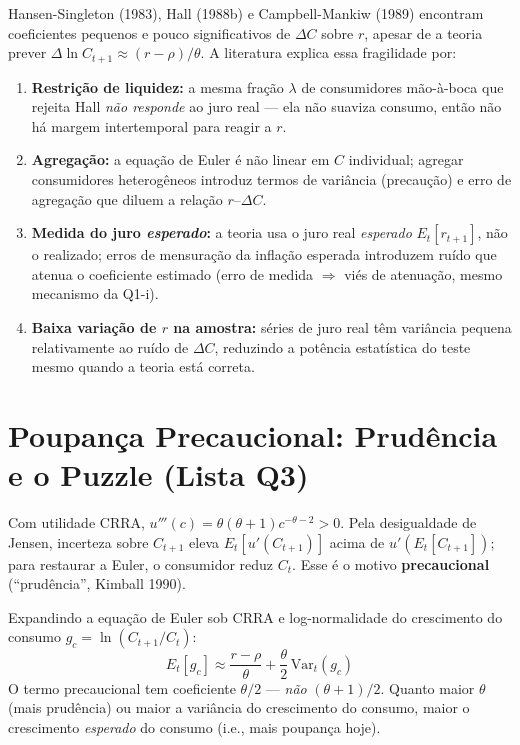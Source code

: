 \documentclass[12pt, a4paper]{article}
\begin{document}
\begin{fatorbox}[title={Q2: por que o juro real tem baixo poder explicativo sobre $\Delta C$?}]
Hansen-Singleton (1983), Hall (1988b) e Campbell-Mankiw (1989) encontram
coeficientes pequenos e pouco significativos de $\Delta C$ sobre $r$, apesar
de a teoria prever $\Delta\ln C_{t+1}\approx(r-\rho)/\theta$. A literatura
explica essa fragilidade por:
\begin{enumerate}[leftmargin=*,label=\textbf{\roman*.}]
  \item \textbf{Restrição de liquidez:} a mesma fração $\lambda$ de
    consumidores mão-à-boca que rejeita Hall \emph{não responde} ao juro
    real --- ela não suaviza consumo, então não há margem intertemporal
    para reagir a $r$.
  \item \textbf{Agregação:} a equação de Euler é não linear em $C$ individual;
    agregar consumidores heterogêneos introduz termos de variância
    (precaução) e erro de agregação que diluem a relação $r$--$\Delta C$.
  \item \textbf{Medida do juro \emph{esperado}:} a teoria usa o juro real
    \emph{esperado} $E_t[r_{t+1}]$, não o realizado; erros de mensuração da
    inflação esperada introduzem ruído que atenua o coeficiente estimado
    (erro de medida $\Rightarrow$ viés de atenuação, mesmo mecanismo da
    Q1-i).
  \item \textbf{Baixa variação de $r$ na amostra:} séries de juro real têm
    variância pequena relativamente ao ruído de $\Delta C$, reduzindo a
    potência estatística do teste mesmo quando a teoria está correta.
\end{enumerate}
\end{fatorbox}

\section{Poupança Precaucional: Prudência e o Puzzle (Lista Q3)}

\begin{formulabox}[title={Prudência: $u'''>0$}]
Com utilidade CRRA, $u'''(c)=\theta(\theta+1)c^{-\theta-2}>0$. Pela
desigualdade de Jensen, incerteza sobre $C_{t+1}$ eleva
$E_t[u'(C_{t+1})]$ acima de $u'(E_t[C_{t+1}])$; para restaurar a Euler, o
consumidor reduz $C_t$. Esse é o motivo \textbf{precaucional}
(``prudência'', Kimball 1990).
\end{formulabox}

\begin{formulabox}[title={Aproximação de segunda ordem (forma correta)}]
Expandindo a equação de Euler sob CRRA e log-normalidade do crescimento do
consumo $g_c=\ln(C_{t+1}/C_t)$:
\[
  \boxed{E_t[g_c] \approx \frac{r-\rho}{\theta} + \frac{\theta}{2}\,\mathrm{Var}_t(g_c)}
\]
O termo precaucional tem coeficiente $\theta/2$ --- \emph{não} $(\theta+1)/2$.
Quanto maior $\theta$ (mais prudência) ou maior a variância do crescimento do
consumo, maior o crescimento \emph{esperado} do consumo (i.e., mais poupança
hoje).
\end{formulabox}
\end{document}
